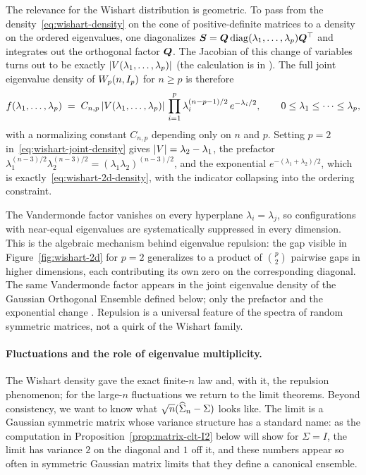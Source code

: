 The relevance for the Wishart distribution is geometric. To pass from the density~\eqref{eq:wishart-density} on the cone of positive-definite matrices to a density on the ordered eigenvalues, one diagonalizes \(\bm{S} = \bm{Q} \operatorname{diag}(\lambda_1, \ldots, \lambda_p) \bm{Q}^{\top}\) and integrates out the orthogonal factor \(\bm{Q}\). The Jacobian of this change of variables turns out to be exactly \(\lvert V(\lambda_1, \ldots, \lambda_p)\rvert\) (the calculation is in \citet[][\S~3.2]{Muirhead1982}). The full joint eigenvalue density of \(W_{p}(n, I_p)\) for \(n \ge p\) is therefore
\begin{equation}
  f(\lambda_1, \ldots, \lambda_p)
  \;=\;
  C_{n,p}\, \lvert V(\lambda_1, \ldots, \lambda_p)\rvert\, \prod_{i=1}^p \lambda_i^{(n-p-1)/2}\, e^{-\lambda_i/2},
  \qquad 0 \le \lambda_1 \le \cdots \le \lambda_p,
  \label{eq:wishart-joint-density}
\end{equation}
with a normalizing constant \(C_{n,p}\) depending only on \(n\) and \(p\). Setting \(p = 2\) in~\eqref{eq:wishart-joint-density} gives \(\lvert V\rvert = \lambda_2 - \lambda_1\), the prefactor \(\lambda_1^{(n-3)/2} \lambda_2^{(n-3)/2} = (\lambda_1 \lambda_2)^{(n-3)/2}\), and the exponential \(e^{-(\lambda_1 + \lambda_2)/2}\), which is exactly~\eqref{eq:wishart-2d-density}, with the indicator collapsing into the ordering constraint.

The Vandermonde factor vanishes on every hyperplane \(\lambda_i = \lambda_j\), so configurations with near-equal eigenvalues are systematically suppressed in every dimension. This is the algebraic mechanism behind eigenvalue repulsion: the gap visible in Figure~\ref{fig:wishart-2d} for \(p = 2\) generalizes to a product of \(\binom{p}{2}\) pairwise gaps in higher dimensions, each contributing its own zero on the corresponding diagonal. The same Vandermonde factor appears in the joint eigenvalue density of the Gaussian Orthogonal Ensemble defined below; only the prefactor and the exponential change \citep{AndersonGuionnetZeitouni2010}. Repulsion is a universal feature of the spectra of random symmetric matrices, not a quirk of the Wishart family.

\paragraph{Fluctuations and the role of eigenvalue multiplicity.} The Wishart density gave the exact finite-\(n\) law and, with it, the repulsion phenomenon; for the large-\(n\) fluctuations we return to the limit theorems. Beyond consistency, we want to know what \(\sqrt{n}(\widehat{\Sigma}_n - \Sigma)\) looks like. The limit is a Gaussian symmetric matrix whose variance structure has a standard name: as the computation in Proposition~\ref{prop:matrix-clt-I2} below will show for \(\Sigma = I\), the limit has variance \(2\) on the diagonal and \(1\) off it, and these numbers appear so often in symmetric Gaussian matrix limits that they define a canonical ensemble.

